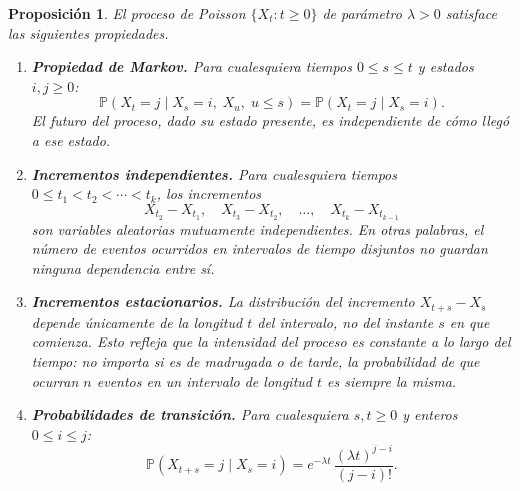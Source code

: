 \documentclass[12pt]{book}
\newtheorem{proposition}{Proposición}[chapter]
\begin{document}
\begin{proposition}
El proceso de Poisson $\{X_t : t \ge 0\}$ de parámetro $\lambda > 0$ satisface las siguientes propiedades.
\begin{enumerate}
    \item[\normalfont(a)] \textbf{Propiedad de Markov.} Para cualesquiera tiempos $0 \le s \le t$ y estados $i, j \ge 0$:
    \[
        \mathbb{P}(X_t = j \mid X_s = i,\; X_{u},\; u \le s) = \mathbb{P}(X_t = j \mid X_s = i).
    \]
    El futuro del proceso, dado su estado presente, es independiente de cómo llegó a ese estado.

    \item[\normalfont(b)] \textbf{Incrementos independientes.} Para cualesquiera tiempos $0 \le t_1 < t_2 < \cdots < t_k$, los incrementos
    \[
        X_{t_2} - X_{t_1},\quad X_{t_3} - X_{t_2},\quad \ldots,\quad X_{t_k} - X_{t_{k-1}}
    \]
    son variables aleatorias \emph{mutuamente independientes}. En otras palabras, el número de eventos ocurridos en intervalos de tiempo disjuntos no guardan ninguna dependencia entre sí.

    \item[\normalfont(c)] \textbf{Incrementos estacionarios.} La distribución del incremento $X_{t+s} - X_s$ depende únicamente de la longitud $t$ del intervalo, no del instante $s$ en que comienza. Esto refleja que la intensidad del proceso es constante a lo largo del tiempo: no importa si es de madrugada o de tarde, la probabilidad de que ocurran $n$ eventos en un intervalo de longitud $t$ es siempre la misma.

    \item[\normalfont(d)] \textbf{Probabilidades de transición.} Para cualesquiera $s, t \ge 0$ y enteros $0 \le i \le j$:
    \[
        \mathbb{P}(X_{t+s} = j \mid X_s = i) = e^{-\lambda t}\,\frac{(\lambda t)^{j-i}}{(j-i)!}.
    \]
\end{enumerate}
\end{proposition}
\end{document}

